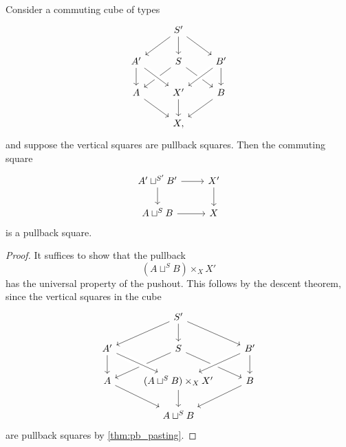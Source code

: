 
\begin{thm}\label{thm:flattening}
Consider a commuting cube of types 
\begin{equation*}\label{eq:cube}
\begin{tikzcd}
& S' \arrow[dl] \arrow[dr] \arrow[d] \\
A' \arrow[d] & S \arrow[dl] \arrow[dr] & B' \arrow[dl,crossing over] \arrow[d] \\
A \arrow[dr] & X' \arrow[d] \arrow[from=ul,crossing over] & B \arrow[dl] \\
& X,
\end{tikzcd}
\end{equation*}
and suppose the vertical squares are pullback squares. Then the commuting square
\begin{equation*}
\begin{tikzcd}
A' \sqcup^{S'} B' \arrow[r] \arrow[d] & X' \arrow[d] \\
A\sqcup^{S} B \arrow[r] & X
\end{tikzcd}
\end{equation*}
is a pullback square.
\end{thm}

\begin{proof}
It suffices to show that the pullback 
\begin{equation*}
(A\sqcup^{S} B)\times_{X}X'
\end{equation*}
has the universal property of the pushout. This follows by the descent theorem, since the vertical squares in the cube
\begin{equation*}
\begin{tikzcd}
& S' \arrow[dl] \arrow[dr] \arrow[d] \\
A' \arrow[d] & S \arrow[dl] \arrow[dr] & B' \arrow[dl,crossing over] \arrow[d] \\
A \arrow[dr] & (A\sqcup^{S} B)\times_{X}X' \arrow[d] \arrow[from=ul,crossing over] & B \arrow[dl] \\
& A\sqcup^{S} B
\end{tikzcd}
\end{equation*}
are pullback squares by \cref{thm:pb_pasting}.
\end{proof}

